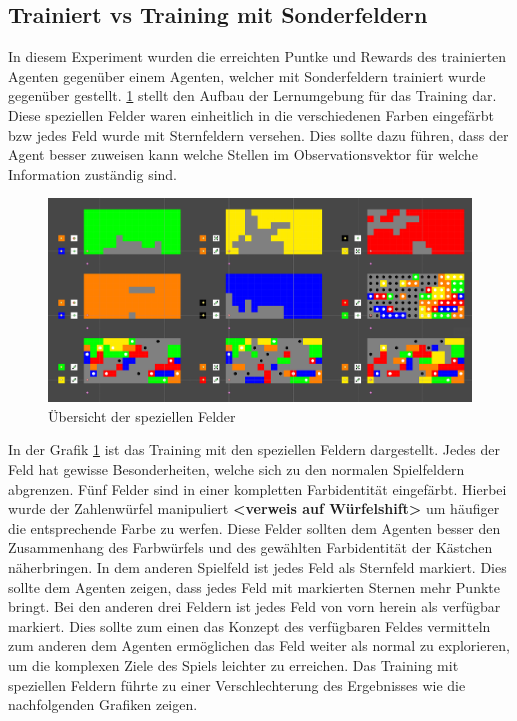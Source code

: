 \newpage
\subsection{Trainiert vs Training mit Sonderfeldern}
In diesem Experiment wurden die erreichten Puntke und Rewards des trainierten Agenten gegenüber einem Agenten, welcher mit Sonderfeldern trainiert wurde gegenüber gestellt. \ref{fig:specialFields} stellt den Aufbau der Lernumgebung für das Training dar. Diese speziellen Felder waren einheitlich in die verschiedenen Farben eingefärbt bzw jedes Feld wurde mit Sternfeldern versehen. Dies sollte dazu führen, dass der Agent besser zuweisen kann welche Stellen im Observationsvektor für welche Information zuständig sind. 

\begin{figure}[!h]
    \centering
    \includegraphics[scale=0.4]{Bilder/specialFields.png}
    \caption{Übersicht der speziellen Felder}
    \label{fig:specialFields}
\end{figure}

In der Grafik \ref{fig:specialFields} ist das Training mit den speziellen Feldern dargestellt. Jedes der Feld hat gewisse Besonderheiten, welche sich zu den normalen Spielfeldern abgrenzen.
Fünf Felder sind in einer kompletten Farbidentität eingefärbt. Hierbei wurde der Zahlenwürfel manipuliert \textbf{<verweis auf Würfelshift>} um häufiger die entsprechende Farbe zu werfen. Diese Felder sollten dem Agenten besser den Zusammenhang des Farbwürfels und des gewählten Farbidentität der Kästchen näherbringen.
In dem anderen Spielfeld ist jedes Feld als Sternfeld markiert. Dies sollte dem Agenten zeigen, dass jedes Feld mit markierten Sternen mehr Punkte bringt.
Bei den anderen drei Feldern ist jedes Feld von vorn herein als verfügbar markiert. Dies sollte zum einen das Konzept des verfügbaren Feldes vermitteln zum anderen dem Agenten ermöglichen das Feld weiter als normal zu explorieren, um die komplexen Ziele des Spiels leichter zu erreichen.
Das Training mit speziellen Feldern führte zu einer Verschlechterung des Ergebnisses wie die nachfolgenden Grafiken zeigen.


